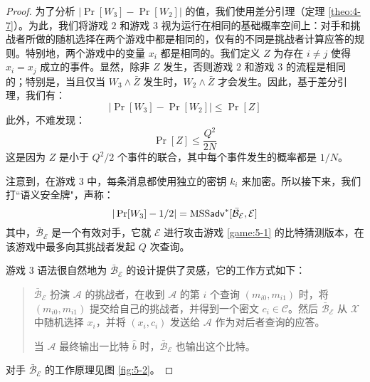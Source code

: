 \begin{proof}
\vspace{5pt}

为了分析 $|\Pr[W_3]-\Pr[W_2]|$ 的值，我们使用差分引理（定理 \ref{theo:4-7}）。为此，我们将游戏 $2$ 和游戏 $3$ 视为运行在相同的基础概率空间上：对手和挑战者所做的随机选择在两个游戏中都是相同的，仅有的不同是挑战者计算应答的规则。特别地，两个游戏中的变量 $x_i$ 都是相同的。我们定义 $Z$ 为存在 $i\neq j$ 使得 $x_i=x_j$ 成立的事件。显然，除非 $Z$ 发生，否则游戏 $2$ 和游戏 $3$ 的流程是相同的；特别是，当且仅当 $W_3\land\bar{Z}$ 发生时，$W_2\land\bar{Z}$ 才会发生。因此，基于差分引理，我们有：
\begin{equation}\label{eq:5-10}
|\Pr[W_3]-\Pr[W_2]|\leq\Pr[Z]
\end{equation}
此外，不难发现：
\begin{equation}\label{eq:5-11}
\Pr[Z]\leq\frac{Q^2}{2N}
\end{equation}
这是因为 $Z$ 是小于 ${Q^2}/{2}$ 个事件的联合，其中每个事件发生的概率都是 ${1}/{N}$。

注意到，在游戏 $3$ 中，每条消息都使用独立的密钥 $k_i$ 来加密。所以接下来，我们打``语义安全牌"，声称：
\begin{equation}\label{eq:5-12}
|\Pr[W_3]-{1}/{2}|={\rm MSS}\mathsf{adv}^*[\mathcal{\bar{B}}_\mathcal{E}, \mathcal{E}]
\end{equation}
其中，$\mathcal{\bar{B}}_\mathcal{E}$ 是一个有效对手，它就 $\mathcal{E}$ 进行攻击游戏 \ref{game:5-1} 的比特猜测版本，在该游戏中最多向其挑战者发起 $Q$ 次查询。

游戏 $3$ 语法很自然地为 $\mathcal{\bar{B}}_\mathcal{E}$ 的设计提供了灵感，它的工作方式如下：
\begin{quote}
$\mathcal{\bar{B}}_\mathcal{E}$ 扮演 $\mathcal{A}$ 的挑战者，在收到 $\mathcal{A}$ 的第 $i$ 个查询 $(m_{i0},m_{i1})$ 时，将 $(m_{i0},m_{i1})$ 提交给自己的挑战者，并得到一个密文 $c_i\in\mathcal{C}$。然后 $\mathcal{\bar{B}}_\mathcal{E}$ 从 $\mathcal{X}$ 中随机选择 $x_i$，并将 $(x_i,c_i)$ 发送给 $\mathcal{A}$ 作为对后者查询的应答。

当 $\mathcal{A}$ 最终输出一比特 $\hat{b}$ 时，$\mathcal{\bar{B}}_\mathcal{E}$ 也输出这个比特。
\end{quote}
对手 $\mathcal{\bar{B}}_\mathcal{E}$ 的工作原理见图 \ref{fig:5-2}。



\end{proof}
